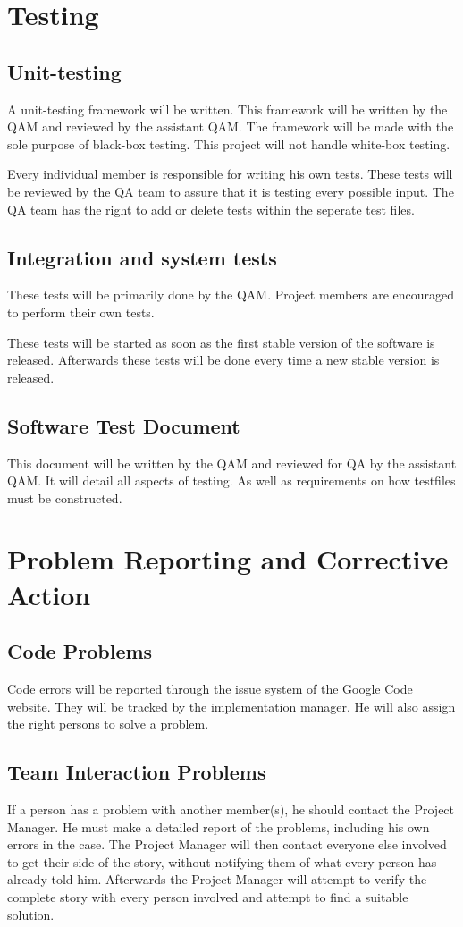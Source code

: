 \documentclass[salesmen, twoside]{softproj}
\begin{document}
\begin{projdoc}
\chapter{Testing}
\section{Unit-testing}
A unit-testing framework will be written. This framework will be written by the QAM and reviewed by the assistant QAM. The framework will be made with the sole purpose of black-box testing. This project will not handle white-box testing.

Every individual member is responsible for writing his own tests. These tests will be reviewed by the QA team to assure that it is testing every possible input. The QA team has the right to add or delete tests within the seperate test files.

\section{Integration and system tests}
These tests will be primarily done by the QAM. Project members are encouraged to perform their own tests.

These tests will be started as soon as the first stable version of the software is released. Afterwards these tests will be done every time a new stable version is released.

\section{Software Test Document}
This document will be written by the QAM and reviewed for QA by the assistant QAM. It will detail all aspects of testing. As well as requirements on how testfiles must be constructed.


\chapter{Problem Reporting and Corrective Action}
\section{Code Problems}
Code errors will be reported through the issue system of the Google Code website. They will be tracked by the implementation manager. He will also assign the right persons to solve a problem.

\section{Team Interaction Problems}
If a person has a problem with another member(s), he should contact the Project Manager. He must make a detailed report of the problems, including his own errors in the case. The Project Manager will then contact everyone else involved to get their side of the story, without notifying them of what every person has already told him. Afterwards the Project Manager will attempt to verify the complete story with every person involved and attempt to find a suitable solution.


\end{projdoc}
\end{document}
